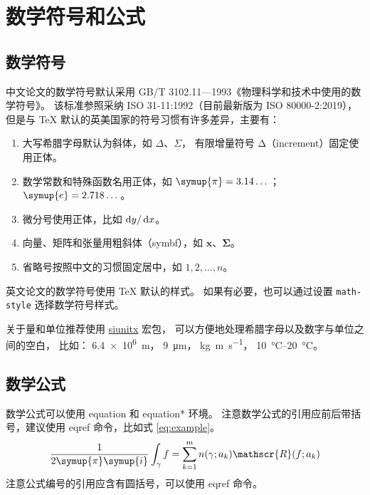 
\chapter{数学符号和公式}

\section{数学符号}

中文论文的数学符号默认采用 GB/T 3102.11—1993《物理科学和技术中使用的数学符号》。
该标准参照采纳 ISO 31-11:1992（目前最新版为 ISO 80000-2:2019），
但是与 \TeX{} 默认的英美国家的符号习惯有许多差异，主要有：
\begin{enumerate}
  \item 大写希腊字母默认为斜体，如 $\Delta$、$\Sigma$，
    有限增量符号 $\increment$（{increment}）固定使用正体。
  \item 数学常数和特殊函数名用正体，如 $\symup{\pi} = 3.14\dots$；$\symup{e} = 2.718\dots$。
  \item 微分号使用正体，比如 $\mathop{}\!\mathrm{d} y / \mathop{}\!\mathrm{d} x$。
  \item 向量、矩阵和张量用粗斜体（{symbf}），如 $\symbf{x}$、$\symbf{\Sigma}$。
  \item 省略号按照中文的习惯固定居中，如 $1, 2, \dots, n$。
\end{enumerate}

英文论文的数学符号使用 \TeX{} 默认的样式。
如果有必要，也可以通过设置 \verb|math-style| 选择数学符号样式。

关于量和单位推荐使用
\href{http://mirrors.ctan.org/macros/latex/contrib/siunitx/siunitx.pdf}{{siunitx}}
宏包，
可以方便地处理希腊字母以及数字与单位之间的空白，
比如：
\SI{6.4e6}{m}，
\SI{9}{\micro\meter}，
\si{kg.m.s^{-1}}，
\SIrange{10}{20}{\degreeCelsius}。



\section{数学公式}

数学公式可以使用 {equation} 和 {equation*} 环境。
注意数学公式的引用应前后带括号，建议使用 {eqref} 命令，比如式 \eqref{eq:example}。
\begin{equation}
  \frac{1}{2 \symup{\pi} \symup{i}} \int_\gamma f = \sum_{k=1}^m n(\gamma; a_k) \mathscr{R}(f; a_k)
  \label{eq:example}
\end{equation}
注意公式编号的引用应含有圆括号，可以使用 {eqref} 命令。

